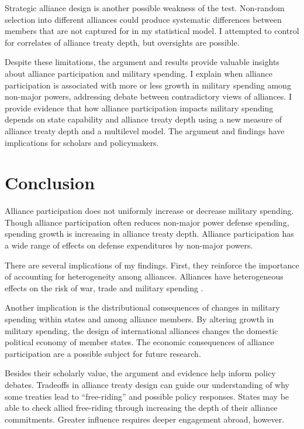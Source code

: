 \documentclass[12pt]{article}
\begin{document}
Strategic alliance design is another possible weakness of the test. 
Non-random selection into different alliances could produce systematic differences between members that are not captured for in my statistical model. 
I attempted to control for correlates of alliance treaty depth, but oversights are possible.


Despite these limitations, the argument and results provide valuable insights about alliance participation and military spending. 
I explain when alliance participation is associated with more or less growth in military spending among non-major powers, addressing debate between contradictory views of alliances.  
I provide evidence that how alliance participation impacts military spending depends on state capability and alliance treaty depth using a new measure of alliance treaty depth and a multilevel model. 
The argument and findings have implications for scholars and policymakers. 


\section{Conclusion}

Alliance participation does not uniformly increase or decrease military spending. 
Though alliance participation often reduces non-major power defense spending, spending growth is increasing in alliance treaty depth. 
Alliance participation has a wide range of effects on defense expenditures by non-major powers. 


There are several implications of my findings.  
First, they reinforce the importance of accounting for heterogeneity among alliances.
Alliances have heterogeneous effects on the risk of war, trade and military spending \citep{Leeds2003, LongLeeds2006, Benson2012, DigiuseppePoast2016}. 


Another implication is the distributional consequences of changes in military spending within states and among alliance members.  
By altering growth in military spending, the design of international alliances changes the domestic political economy of member states. 
The economic consequences of alliance participation are a possible subject for future research. 


Besides their scholarly value, the argument and evidence help inform policy debates. 
Tradeoffs in alliance treaty design can guide our understanding of why some treaties lead to ``free-riding'' and possible policy responses. 
States may be able to check allied free-riding through increasing the depth of their alliance commitments. 
Greater influence requires deeper engagement abroad, however. 
\end{document}
